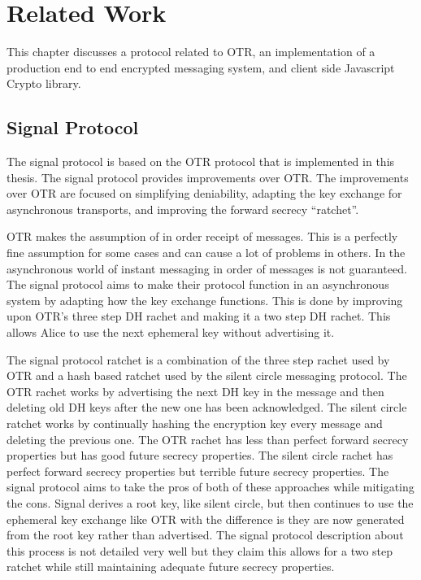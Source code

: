 \chapter{Related Work}


This chapter discusses a protocol related to OTR, an implementation of a production end to end encrypted messaging system, and client side Javascript Crypto library.


\section{Signal Protocol} 


The signal protocol is based on the OTR protocol that is implemented in this thesis. The signal protocol provides improvements over OTR. The improvements over OTR are focused on simplifying deniability, adapting the key exchange for asynchronous transports, and improving the forward secrecy “ratchet”.\cite{whisper-overview}


OTR makes the assumption of in order receipt of messages. This is a perfectly fine assumption for some cases and can cause a lot of problems in others. In the asynchronous world of instant messaging in order of messages is not guaranteed. The signal protocol aims to make their protocol function in an asynchronous system by adapting how the key exchange functions. This is done by improving upon OTR’s three step DH rachet and making it a two step DH rachet. This allows Alice to use the next ephemeral key without advertising it.


The signal protocol ratchet is a combination of the three step rachet used by OTR and a hash based ratchet used by the silent circle messaging protocol. The OTR rachet works by advertising the next DH key in the message and then deleting old DH keys after the new one has been acknowledged. The silent circle ratchet works by continually hashing the encryption key every message and deleting the previous one. The OTR rachet has less than perfect forward secrecy properties but has good future secrecy properties. The silent circle rachet has perfect forward secrecy properties but terrible future secrecy properties. The signal protocol aims to take the pros of both of these approaches while mitigating the cons. Signal derives a root key, like silent circle, but then continues to use the ephemeral key exchange like OTR with the difference is they are now generated from the root key rather than advertised. The signal protocol description about this process is not detailed very well but they claim this allows for a two step ratchet while still maintaining adequate future secrecy properties.
 
